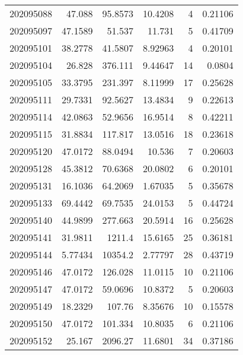 \begin{tabular}{rrrrrr}
 202095088 &         47.088   &       95.8573 &           10.4208  &           4 & 0.21106 \\
 202095097 &         47.1589  &       51.537  &           11.731   &           5 & 0.41709 \\
 202095101 &         38.2778  &       41.5807 &            8.92963 &           4 & 0.20101 \\
 202095104 &         26.828   &      376.111  &            9.44647 &          14 & 0.0804  \\
 202095105 &         33.3795  &      231.397  &            8.11999 &          17 & 0.25628 \\
 202095111 &         29.7331  &       92.5627 &           13.4834  &           9 & 0.22613 \\
 202095114 &         42.0863  &       52.9656 &           16.9514  &           8 & 0.42211 \\
 202095115 &         31.8834  &      117.817  &           13.0516  &          18 & 0.23618 \\
 202095120 &         47.0172  &       88.0494 &           10.536   &           7 & 0.20603 \\
 202095128 &         45.3812  &       70.6368 &           20.0802  &           6 & 0.20101 \\
 202095131 &         16.1036  &       64.2069 &            1.67035 &           5 & 0.35678 \\
 202095133 &         69.4442  &       69.7535 &           24.0153  &           5 & 0.44724 \\
 202095140 &         44.9899  &      277.663  &           20.5914  &          16 & 0.25628 \\
 202095141 &         31.9811  &     1211.4    &           15.6165  &          25 & 0.36181 \\
 202095144 &          5.77434 &    10354.2    &            2.77797 &          28 & 0.43719 \\
 202095146 &         47.0172  &      126.028  &           11.0115  &          10 & 0.21106 \\
 202095147 &         47.0172  &       59.0696 &           10.8372  &           5 & 0.20603 \\
 202095149 &         18.2329  &      107.76   &            8.35676 &          10 & 0.15578 \\
 202095150 &         47.0172  &      101.334  &           10.8035  &           6 & 0.21106 \\
 202095152 &         25.167   &     2096.27   &           11.6801  &          34 & 0.37186 \\

\end{tabular}

